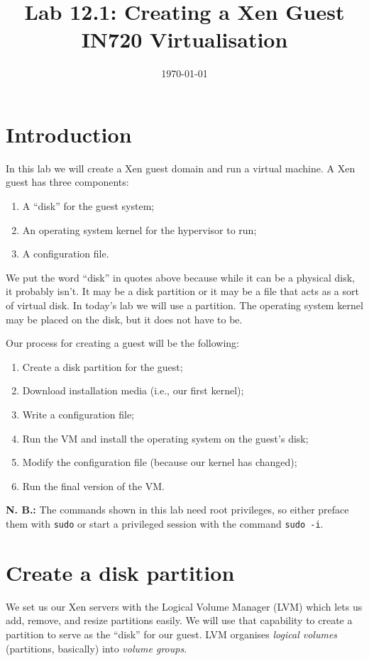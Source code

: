 \documentclass{article}
\begin{document}
\title{Lab 12.1: Creating a Xen Guest\\ IN720 Virtualisation}
\date{\today}
\maketitle

\section*{Introduction}
In this lab we will create a Xen guest domain and run a virtual machine.  A Xen guest has three components:

\begin{enumerate}
  \item A ``disk'' for the guest system;
  \item An operating system kernel for the hypervisor to run;
  \item A configuration file.
\end{enumerate}

We put the word ``disk'' in quotes above because while it can be a physical disk, it probably isn't. It may be a disk partition or it may be a file that acts as a sort of virtual disk. In today's lab we will use a partition. The operating system kernel may be placed on the disk, but it does not have to be.

Our process for creating a guest will be the following:

\begin{enumerate}
  \item Create a disk partition for the guest;
  \item Download installation media (i.e., our first kernel);
  \item Write a configuration file;
  \item Run the VM and install the operating system on the guest's disk;
  \item Modify the configuration file (because our kernel has changed);
  \item Run the final version of the VM.
 \end{enumerate}
 
 \textbf{N. B.:} The commands shown in this lab need root privileges, so either preface them with \texttt{sudo} or start a privileged session with the command 
 \texttt{sudo -i}.
 
 \section{Create a disk partition}
 We set us our Xen servers with the Logical Volume Manager (LVM) which lets us add, remove, and resize partitions easily. We will use that capability to create a partition to serve as the ``disk'' for our guest. LVM organises \emph{logical volumes} (partitions, basically) into \emph{volume groups}.
 
\end{document}
